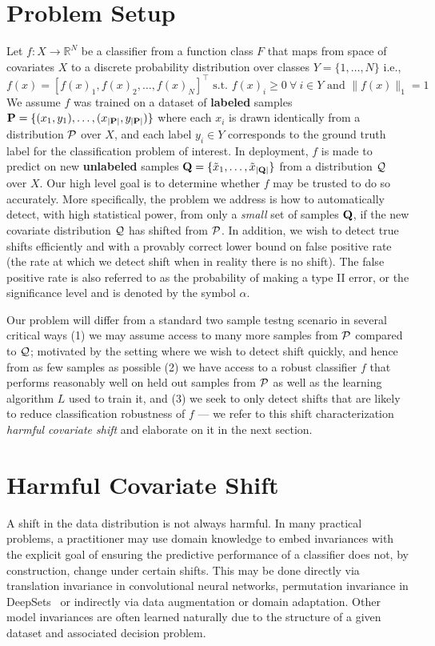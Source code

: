\section{Problem Setup}\label{sec:problem-setup}
Let $f: X\to \mathbb{R}^N $ be a classifier from a function class $F$ that maps from space of covariates $X$ to a discrete probability distribution over classes $Y=\{1,\ldots,N\}$ i.e.,
\[f(x)=[f(x)_1, f(x)_2, \ldots, f(x)_N]^\top\text{ s.t. }f(x)_i \geq 0\ \forall\ i\in Y \text{ and } \|f(x)\|_1 = 1\]
We assume $f$ was trained on a dataset of \textbf{labeled} samples $\mathbf{P}=\{(x_1,y_1),\ldots,(x_{|\mathbf{P}|}, y_{|\mathbf{P}|})\}$ where each $x_i$ is drawn identically from a distribution $\mathcal{P}$ over $X$, and
each label $y_i\in Y$ corresponds to the ground truth label for the classification problem of interest.
In deployment, $f$ is made to predict on new \textbf{unlabeled} samples $\mathbf{Q}=\{\tilde{x}_1,\ldots,\tilde{x}_{|\mathbf{Q}|}\}$ from a distribution $\mathcal{Q}$ over $X$.
Our high level goal is to determine whether $f$ may be trusted to do so accurately.
More specifically, the problem we address is how to automatically detect, with high statistical power, from only a \textit{small} set of samples $\mathbf{Q}$,
if the new covariate distribution $\mathcal{Q}$ has shifted from $\mathcal{P}$.
In addition, we wish to detect true shifts efficiently and with a provably correct lower bound on false positive rate (the rate at which we detect shift when in reality there is no shift).
The false positive rate is also referred to as the probability of making a type II error, or the significance level and is denoted by the symbol $\alpha$.

Our problem will differ from a standard two sample testng scenario in several critical ways (1) we may assume access to many more samples from $\mathcal{P}$
compared to $\mathcal{Q}$; motivated by the setting where we wish to detect shift quickly, and hence from as few samples as possible
(2) we have access to a robust classifier $f$ that performs reasonably well on held out samples from $\mathcal{P}$ as well as the learning algorithm $L$ used to train it, and
(3) we seek to only detect shifts that are likely to reduce classification robustness of $f$ --- we refer to this shift characterization \textit{harmful covariate shift} and elaborate on it in the next section.


\section{Harmful Covariate Shift}\label{sec:harmful-covariate-shift} A shift in the data distribution is not always harmful.
In many practical problems, a practitioner may use domain knowledge to embed invariances with the explicit goal of ensuring the predictive performance of a classifier does not, by construction, change under certain shifts.
This may be done directly via translation invariance in convolutional neural networks, permutation invariance in DeepSets~\citep{deepsets} or indirectly via data augmentation or domain adaptation.
Other model invariances are often learned naturally due to the structure of a given dataset and associated decision problem.

